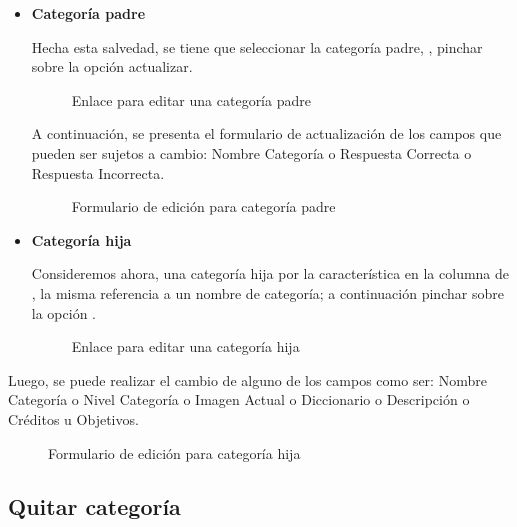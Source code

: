 \begin{itemize}

\item \textbf{Categoría padre}

Hecha esta salvedad, se tiene que seleccionar la categoría padre,
, pinchar sobre la opción actualizar.

\begin{figure}[!ht]
\centering
		\caption{Enlace para editar una categoría padre}
\end{figure}

A continuación, se presenta el formulario de actualización de los campos
que pueden ser sujetos a cambio: Nombre Categoría o Respuesta Correcta o
Respuesta Incorrecta.

\begin{figure}[!ht]
\centering
		\caption{Formulario de edición para categoría padre}
\end{figure}

\item \textbf{Categoría hija}

Consideremos ahora, una categoría hija por la característica en la columna
de , la misma referencia a un nombre de
categoría; a continuación pinchar sobre la opción .

\begin{figure}[!ht]
\centering
		\caption{Enlace para editar una categoría hija}
\end{figure}

\end{itemize}

Luego, se puede realizar el cambio de alguno de los campos como ser: Nombre
Categoría o Nivel Categoría o Imagen Actual o Diccionario o Descripción o
Créditos u Objetivos. 

\begin{figure}[!ht]
\centering
		\caption{Formulario de edición para categoría hija}
\end{figure}

\subsection{Quitar categoría}

